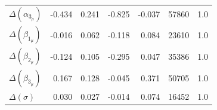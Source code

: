 \documentclass[doc,biblatex]{apa7}
\begin{document}
\begin{table}
\begin{center}
\begin{threeparttable}
\begin{tabular}{lrrrrrr}
$\Delta(\alpha_{3_\mu})$ & -0.434 &  0.241 &  -0.825 &   -0.037 &   57860 &    1.0 \\
$\Delta(\beta_{1_\mu})$  & -0.016 &  0.062 &  -0.118 &    0.084 &   23610 &    1.0 \\
$\Delta(\beta_{2_\mu})$  & -0.124 &  0.105 &  -0.295 &    0.047 &   35386 &    1.0 \\
$\Delta(\beta_{3_\mu})$  &  0.167 &  0.128 &  -0.045 &    0.371 &   50705 &    1.0 \\
$\Delta(σ)$              &  0.030 &  0.027 &  -0.014 &    0.074 &   16452 &    1.0 \\
\bottomrule
\end{tabular}
\label{exp2_parameter_estimates}
\end{threeparttable}
\end{center}
\end{table}
\end{document}
